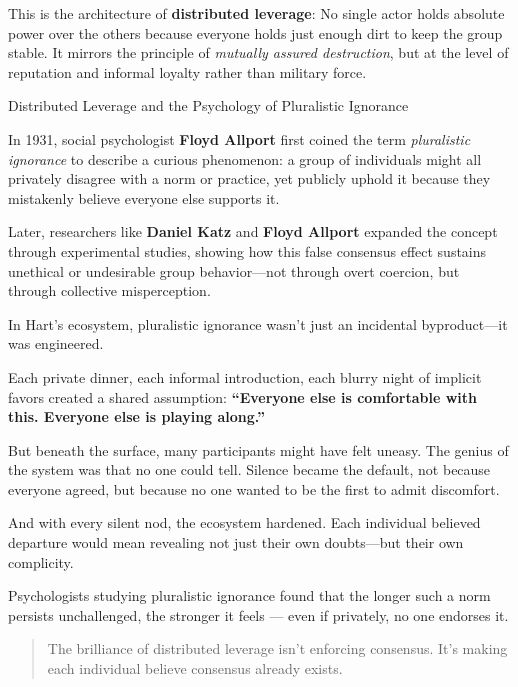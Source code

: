 This is the architecture of \textbf{distributed leverage}:  No single actor holds absolute power over the others because 
everyone holds just enough dirt to keep the group stable. It mirrors the principle of \emph{mutually assured destruction}, 
but at the level of reputation and informal loyalty rather than military force.

\medskip

\begin{PsychologicalSidebar}{Distributed Leverage and the Psychology of Pluralistic Ignorance}

  In 1931, social psychologist \textbf{Floyd Allport} first coined the term \emph{pluralistic ignorance} to describe a 
  curious phenomenon: a group of individuals might all privately disagree with a norm or practice, yet publicly uphold 
  it because they mistakenly believe everyone else supports it.
  \medskip

  Later, researchers like \textbf{Daniel Katz} and \textbf{Floyd Allport} expanded the concept through experimental 
  studies, showing how this false consensus effect sustains unethical or undesirable group behavior—not through overt 
  coercion, but through collective misperception.

  \medskip

  In Hart’s ecosystem, pluralistic ignorance wasn’t just an incidental byproduct—it was engineered.

  \medskip

  Each private dinner, each informal introduction, each blurry night of implicit favors created a shared assumption: 
  \textbf{“Everyone else is comfortable with this. Everyone else is playing along.”}

  \medskip

  But beneath the surface, many participants might have felt uneasy. The genius of the system was that no one could 
  tell. Silence became the default, not because everyone agreed, but because no one wanted to be the first to admit 
  discomfort.

  \medskip

  And with every silent nod, the ecosystem hardened. Each individual believed departure would mean revealing not just 
  their own doubts—but their own complicity.

  \medskip

  Psychologists studying pluralistic ignorance found that the longer such a norm persists unchallenged, the stronger 
  it feels --- even if privately, no one endorses it.

  \begin{quote}
    The brilliance of distributed leverage isn’t enforcing consensus.  It’s making each individual believe consensus 
    already exists.
  \end{quote}

\end{PsychologicalSidebar}

